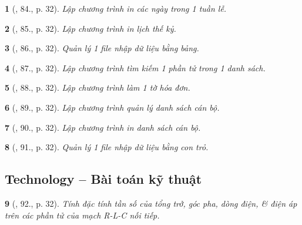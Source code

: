 \documentclass{article}
\newtheorem{baitoan}{}
\begin{document}
\begin{baitoan}[\cite{Doanh_Tuan_Pascal}, 84., p. 32]
	Lập chương trình in các ngày trong 1 tuần lễ.
\end{baitoan}

\begin{baitoan}[\cite{Doanh_Tuan_Pascal}, 85., p. 32]
	Lập chương trình in lịch thế kỷ.
\end{baitoan}

\begin{baitoan}[\cite{Doanh_Tuan_Pascal}, 86., p. 32]
	Quản lý 1 file nhập dữ liệu bằng bảng.
\end{baitoan}

\begin{baitoan}[\cite{Doanh_Tuan_Pascal}, 87., p. 32]
	Lập chương trình tìm kiếm 1 phần tử trong 1 danh sách.
\end{baitoan}

\begin{baitoan}[\cite{Doanh_Tuan_Pascal}, 88., p. 32]
	Lập chương trình làm 1 tờ hóa đơn.
\end{baitoan}

\begin{baitoan}[\cite{Doanh_Tuan_Pascal}, 89., p. 32]
	Lập chương trình quản lý danh sách cán bộ.
\end{baitoan}

\begin{baitoan}[\cite{Doanh_Tuan_Pascal}, 90., p. 32]
	Lập chương trình in danh sách cán bộ.
\end{baitoan}

\begin{baitoan}[\cite{Doanh_Tuan_Pascal}, 91., p. 32]
	Quản lý 1 file nhập dữ liệu bằng con trỏ.
\end{baitoan}


\subsection{Technology -- Bài toán kỹ thuật}

\begin{baitoan}[\cite{Doanh_Tuan_Pascal}, 92., p. 32]
	Tính đặc tính tần số của tổng trở, góc pha, dòng điện, \& điện áp trên các phần tử của mạch R-L-C nối tiếp.
\end{baitoan}
\end{document}

